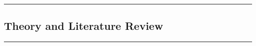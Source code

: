 {\color{gray}\hrule}
\begin{center}
\section{Theory and Literature Review}
\bigskip
\end{center}
{\color{gray}\hrule}
\begin{multicols}{2}
\lipsum
\end{multicols}
